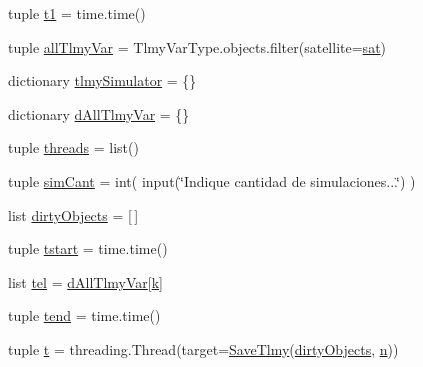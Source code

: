 \begin{DoxyCompactItemize}
\item 
tuple \hyperlink{namespace_simulators_1_1_telemetry_processor_a12bc7f6b923142a1a0cc282b21648fd5}{t1} = time.\+time()
\item 
tuple \hyperlink{namespace_simulators_1_1_telemetry_processor_adf9bda1e07561e22f7fd77bc9467ace6}{all\+Tlmy\+Var} = Tlmy\+Var\+Type.\+objects.\+filter(satellite=\hyperlink{namespace_simulators_1_1_telemetry_processor_a0853713b806ec7ae27394839316688a4}{sat})
\item 
dictionary \hyperlink{namespace_simulators_1_1_telemetry_processor_a135852f6b75dc272f6d1db863bd290c6}{tlmy\+Simulator} = \{\}
\item 
dictionary \hyperlink{namespace_simulators_1_1_telemetry_processor_a937de4fb49355315e9cf23ca29d51a3a}{d\+All\+Tlmy\+Var} = \{\}
\item 
tuple \hyperlink{namespace_simulators_1_1_telemetry_processor_a4cb7a92c4d13d088c7763dd6a5597446}{threads} = list()
\item 
tuple \hyperlink{namespace_simulators_1_1_telemetry_processor_a7fe4cce5cc73c8db7435572440377e9d}{sim\+Cant} = int( input(\char`\"{}Indique cantidad de simulaciones...\char`\"{}) )
\item 
list \hyperlink{namespace_simulators_1_1_telemetry_processor_aa425ba047b0408bf6e05f599222c6bee}{dirty\+Objects} = \mbox{[}$\,$\mbox{]}
\item 
tuple \hyperlink{namespace_simulators_1_1_telemetry_processor_a6dd741085429d34d1cba94d3e166de78}{tstart} = time.\+time()
\item 
list \hyperlink{namespace_simulators_1_1_telemetry_processor_a9e946b833e211303ea3536275fec883f}{tel} = \hyperlink{namespace_simulators_1_1_telemetry_processor_a937de4fb49355315e9cf23ca29d51a3a}{d\+All\+Tlmy\+Var}\mbox{[}\hyperlink{jquery_8js_ab26645c014aa005ecedef329ecf58c99}{k}\mbox{]}
\item 
tuple \hyperlink{namespace_simulators_1_1_telemetry_processor_ac1232c885cb32bbc1c21e374e335299b}{tend} = time.\+time()
\item 
tuple \hyperlink{namespace_simulators_1_1_telemetry_processor_a5c52853408a5a4a37c50b60b7051ef1f}{t} = threading.\+Thread(target=\hyperlink{namespace_simulators_1_1_telemetry_processor_ad9e1575da9b3c1f3fde7e7cc688995d8}{Save\+Tlmy}(\hyperlink{namespace_simulators_1_1_telemetry_processor_aa425ba047b0408bf6e05f599222c6bee}{dirty\+Objects}, \hyperlink{namespace_simulators_1_1_telemetry_processor_adc73b3fce91792369a602ff747603555}{n}))
\end{DoxyCompactItemize}


